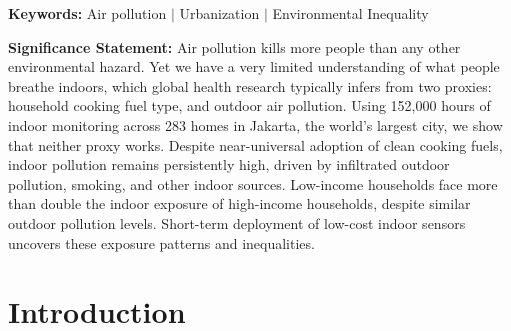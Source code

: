 \documentclass[reqno,12pt,notitlepage]{article}
\providecommand{\DIFadd}[1]{{\protect\color{BLUE}#1}} %
\providecommand{\DIFdel}[1]{{\protect\color{red}\sout{#1}}} %
\providecommand{\DIFaddbegin}{} %
\providecommand{\DIFaddend}{} %
\providecommand{\DIFdelbegin}{} %
\providecommand{\DIFdelend}{} %
\begin{document}
\begin{abstract}
{We uncover stark exposure inequality: low-income households experience 112\% higher indoor PM$_{2.5}$ than high-income households despite similar outdoor exposure. This inequality is mostly driven by differences in indoor emission sources, particularly smoking.
Low-cost indoor monitoring reveals what neither cooking fuel type nor outdoor concentrations can capture: actual indoor exposure and its stark distributional consequences in rapidly urbanizing megacities}\DIFaddend . 
\DIFdelbegin \DIFdel{Researchers and policymakers should also integrate outdoor air quality mapping with demographically representative indoor monitoring to close key data gaps, enabling more accurate exposure estimates and better-targeted environmental health policies.
}\DIFdelend \end{abstract}

\bigskip
\noindent\textbf{Keywords:} Air pollution $|$ Urbanization $|$ Environmental Inequality

\DIFaddbegin \bigskip
\noindent\textbf{Significance Statement:}
\DIFadd{Air pollution kills more people than any other environmental hazard. Yet we have a very limited understanding of what people breathe indoors, which global health research typically infers from two proxies: household cooking fuel type, and outdoor air pollution. Using 152,000 hours of indoor monitoring across 283 homes in Jakarta, the world's largest city, we show that neither proxy works. Despite near-universal adoption of clean cooking fuels, indoor pollution remains persistently high, driven by infiltrated outdoor pollution, smoking, and other indoor sources. Low-income households face more than double the indoor exposure of high-income households, despite similar outdoor pollution levels. Short-term deployment of low-cost indoor sensors uncovers these exposure patterns and inequalities.}
\DIFaddend 

\section{Introduction}
\end{document}

